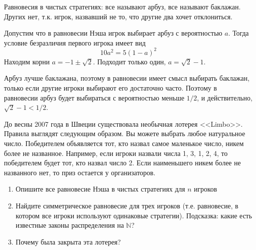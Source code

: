 \begin{solution}
Равновесия в чистых стратегиях: все называют арбуз, все называют баклажан. Других нет, т.к. игрок, назвавший не то, что другие два хочет отклониться.

Допустим что в равновесии Нэша игрок выбирает арбуз с вероятностью $a$. Тогда условие безразличия первого игрока имеет вид
\[
10 a^2 = 5(1-a)^2 
\]
Находим корни $a=-1\pm \sqrt{2}$. Подходит только один, $a=\sqrt{2}-1$.  

Арбуз лучше баклажана, поэтому в равновесии имеет смысл выбирать баклажан, только если другие игроки выбирают его достаточно часто. Поэтому в равновесии арбуз будет выбираться  с вероятностью меньше $1/2$, и действительно, $\sqrt{2}-1<1/2$.
\end{solution}



\begin{problem}
До весны 2007 года в Швеции существовала необычная лотерея <<Limbo>>. Правила выглядят следующим образом. Вы можете выбрать любое натуральное число. Победителем объявляется тот, кто назвал самое маленькое число, никем более не названное. Например, если игроки назвали числа 1, 3, 1, 2, 4, то победителем будет тот, кто назвал число 2. Если наименьшего никем более не названного нет, то приз остается у организаторов. 
\begin{enumerate}
\item  Опишите все равновесие Нэша в чистых стратегиях для $n$ игроков 
\item  Найдите симметрическое равновесие для трех игроков (т.е. равновесие, в котором все игроки используют одинаковые стратегии). Подсказка: какие есть известные законы распределения на $\mathbb{N}$? 
\item Почему была закрыта эта лотерея? 

\end{enumerate}
\end{problem}

